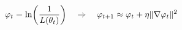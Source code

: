 \documentclass[preview]{standalone}
\begin{document}
\begin{align*}
\special{dvisvgm:raw <g id='unique000'>}\varphi_t = \ln\!\left(\frac{1}{L(\theta_t)}\right)\quad\Rightarrow\quad\varphi_{t+1} \approx \varphi_t + \eta\|\nabla\varphi_t\|^2\special{dvisvgm:raw </g>}
\end{align*}
\end{document}
